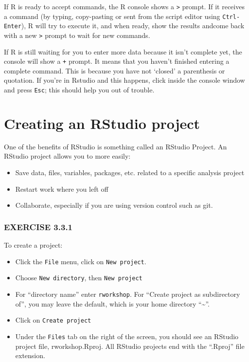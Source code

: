 \documentclass[
]{book}
\providecommand{\tightlist}{%
  \setlength{\itemsep}{0pt}\setlength{\parskip}{0pt}}
\begin{document}
If R is ready to accept commands, the R console shows a \texttt{\textgreater{}} prompt. If it receives a command (by typing, copy-pasting or sent from the script editor using \texttt{Ctrl-Enter}), R will try to execute it, and when ready, show the results andcome back with a new \texttt{\textgreater{}} prompt to wait for new commands.

If R is still waiting for you to enter more data because it isn't complete yet, the console will show a \texttt{+} prompt. It means that you haven't finished entering a complete command. This is because you have not `closed' a parenthesis or quotation. If you're in Rstudio and this happens, click inside the console window and press \texttt{Esc}; this should help you out of trouble.

\hypertarget{creating-an-rstudio-project}{%
\section{Creating an RStudio project}\label{creating-an-rstudio-project}}

One of the benefits of RStudio is something called an RStudio Project. An RStudio project allows you to more easily:

\begin{itemize}
\tightlist
\item
  Save data, files, variables, packages, etc. related to a specific analysis project
\item
  Restart work where you left off
\item
  Collaborate, especially if you are using version control such as git.
\end{itemize}

\hypertarget{exercise-3.3.1}{%
\subsubsection*{EXERCISE 3.3.1}\label{exercise-3.3.1}}

To create a project:

\begin{itemize}
\tightlist
\item
  Click the \texttt{File} menu, click on \texttt{New\ project}.
\item
  Choose \texttt{New\ directory}, then
  \texttt{New\ project}
\item
  For ``directory name'' enter \texttt{rworkshop}. For ``Create project as subdirectory of'', you may leave the default, which is your home directory ``\textasciitilde{}''.
\item
  Click on \texttt{Create\ project}
\item
  Under the \texttt{Files} tab on the right of the screen, you should see an RStudio project file, rworkshop.Rproj. All RStudio projects end with the ``.Rproj'' file extension.
\end{itemize}
\end{document}

